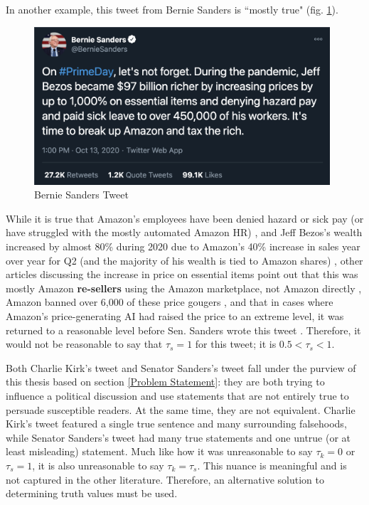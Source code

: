 \documentclass[preprint,review,12pt]{elsarticle}
\begin{document}
In another example, this tweet from Bernie Sanders is ``mostly true" (fig. \ref{fig:Bernie Sanders Tweet, Oct 13, 2020}). 
 \begin{figure}[h]
    \centering
    \includegraphics[width=11cm]{BernieTweet.png}
    \caption{Bernie Sanders Tweet \cite{sanders2020tweet}}
    \label{fig:Bernie Sanders Tweet, Oct 13, 2020}
\end{figure}
While it is true that Amazon's employees have been denied hazard or sick pay (or have struggled with the mostly automated Amazon HR) \cite{cnbc2020amazon,guardian2020amazon}, and Jeff Bezos's wealth increased by almost 80\% during 2020 due to Amazon's 40\% increase in sales year over year for Q2 (and the majority of his wealth is tied to Amazon shares) \cite{Stebbins2020bezos}, other articles discussing the increase in price on essential items point out that this was mostly Amazon \textbf{re-sellers} using the Amazon marketplace, not Amazon directly \cite{nicas2020sanitizer, kim2020price,gibson2020amazon}, Amazon banned over 6,000 of these price gougers \cite{bezos2020letter}, and that in cases where Amazon's price-generating AI had raised the price to an extreme level, it was returned to a reasonable level before Sen. Sanders wrote this tweet \cite{harman2020prime}. Therefore, it would not be reasonable to say that $\tau_s = 1$ for this tweet; it is $ 0.5 < \tau_s < 1$. 

Both Charlie Kirk's tweet and Senator Sanders's tweet fall under the purview of this thesis based on section \ref{Problem Statement}: they are both trying to influence a political discussion and use statements that are not entirely true to persuade susceptible readers. At the same time, they are not equivalent. Charlie Kirk's tweet featured a single true sentence and many surrounding falsehoods, while Senator Sanders's tweet had many true statements and one untrue (or at least misleading) statement. Much like how it was unreasonable to say $\tau_k = 0$ or $\tau_s = 1$, it is also unreasonable to say $\tau_k = \tau_s$. This nuance is meaningful and is not captured in the other literature. Therefore, an alternative solution to determining truth values must be used.
\end{document}
